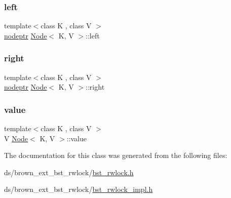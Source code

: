 \mbox{\label{classbst__rwlock__ns_1_1Node_a8bf2cf841310cee1712f7001b4dfe2ad}} 
\subsubsection{\texorpdfstring{left}{left}}
{\footnotesize\ttfamily template$<$class K , class V $>$ \\
\hyperlink{bst__rwlock__impl_8h_a04158d2a20768fe447133ff555823b05}{nodeptr} \hyperlink{classbst__rwlock__ns_1_1Node}{Node}$<$ K, V $>$\+::left}

\mbox{\label{classbst__rwlock__ns_1_1Node_ae519222d8a15edb1ff20d68dd3eeec88}} 
\subsubsection{\texorpdfstring{right}{right}}
{\footnotesize\ttfamily template$<$class K , class V $>$ \\
\hyperlink{bst__rwlock__impl_8h_a04158d2a20768fe447133ff555823b05}{nodeptr} \hyperlink{classbst__rwlock__ns_1_1Node}{Node}$<$ K, V $>$\+::right}

\mbox{\label{classbst__rwlock__ns_1_1Node_ad26872ac51fa4ef5a8519038472a5050}} 
\subsubsection{\texorpdfstring{value}{value}}
{\footnotesize\ttfamily template$<$class K , class V $>$ \\
V \hyperlink{classbst__rwlock__ns_1_1Node}{Node}$<$ K, V $>$\+::value}



The documentation for this class was generated from the following files\+:\begin{DoxyCompactItemize}
\item 
ds/brown\+\_\+ext\+\_\+bst\+\_\+rwlock/\hyperlink{bst__rwlock_8h}{bst\+\_\+rwlock.\+h}\item 
ds/brown\+\_\+ext\+\_\+bst\+\_\+rwlock/\hyperlink{bst__rwlock__impl_8h}{bst\+\_\+rwlock\+\_\+impl.\+h}\end{DoxyCompactItemize}
